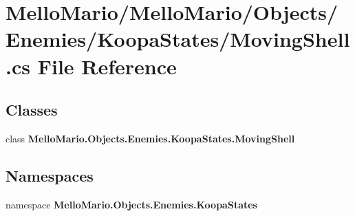 \section{Mello\+Mario/\+Mello\+Mario/\+Objects/\+Enemies/\+Koopa\+States/\+Moving\+Shell.cs File Reference}
\label{MovingShell_8cs}
\subsection*{Classes}
\begin{DoxyCompactItemize}
\item 
class \textbf{ Mello\+Mario.\+Objects.\+Enemies.\+Koopa\+States.\+Moving\+Shell}
\end{DoxyCompactItemize}
\subsection*{Namespaces}
\begin{DoxyCompactItemize}
\item 
namespace \textbf{ Mello\+Mario.\+Objects.\+Enemies.\+Koopa\+States}
\end{DoxyCompactItemize}
